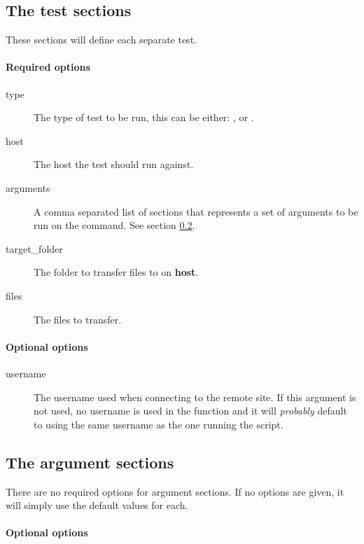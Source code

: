 \subsection{The test sections}
\label{sec:test_sec}

These sections will define each separate test.

\paragraph*{Required options}

\begin{description}
    \item[type] The type of test to be run, this can be either: \verb@scp@,
        \verb@sftp@ or \verb@rsync@.
    \item[host] The host the test should run against.
    \item[arguments] A comma separated list of sections that represents a set
        of arguments to be run on the command. See section
        \ref{sec:argument_sec}.
    \item[target\_folder] The folder to transfer files to on \textbf{host}.
    \item[files] The files to transfer.
\end{description}

\paragraph*{Optional options}

\begin{description}
    \item[username] The username used when connecting to the remote site. If
        this argument is not used, no username is used in the function and it
        will \textit{probably} default to using the same username as the one
        running the script.
\end{description}


\subsection{The argument sections}
\label{sec:argument_sec}

There are no required options for argument sections. If no options are given,
it will simply use the default values for each.

\paragraph*{Optional options}

